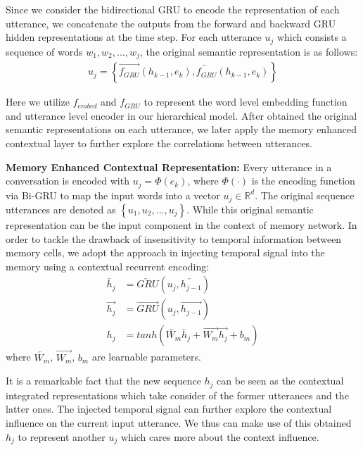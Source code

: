 \documentclass[sigconf]{acmart}
\begin{document}
Since we consider the bidirectional GRU to encode the representation of each utterance, we concatenate the outputs from the forward and backward GRU hidden representations at the time step. For each utterance $u_j$ which consists a sequence of words $w_1,w_2,...,w_j$, the original semantic representation is as follows:
\begin{align*}
	u_j=\left\lbrace \overrightarrow{{f_{GRU}}}(h_{k-1},e_k),\overleftarrow{{f_{GRU}}}(h_{k-1},e_k)  \right\rbrace \tag{2}
\end{align*}   

Here we utilize $f_{embed}$ and $f_{GRU}$ to represent the word level embedding function and utterance level encoder in our hierarchical model. After obtained the original semantic representations on each utterance, we later apply the memory enhanced contextual layer to further explore the correlations between utterances. 

\noindent \textbf{Memory Enhanced Contextual Representation: } Every utterance in a conversation is encoded with $u_j=\Phi(e_k)$, where $\Phi\left (\cdot \right)$ is the encoding function via Bi-GRU to map the input words into a vector $u_j \in \mathbb{R}^d$. The original sequence utterances are denoted as $\left\lbrace u_1,u_2,...,u_j \right\rbrace $. While this original semantic representation can be the input component in the context of memory network. In order to tackle the drawback of insensitivity to temporal information between memory cells, we adopt the approach in injecting temporal signal into the memory using a contextual recurrent encoding:
\begin{align*}
	\overleftarrow{h_j}&=\overleftarrow{GRU}(u_j,\overleftarrow{h_{j-1}}) \\
	\overrightarrow{h_j}&=\overrightarrow{GRU}(u_j,\overrightarrow{h_{j-1}}) \\
	h_j&=tanh(\overleftarrow{W_m}\overleftarrow{h_j}+\overrightarrow{W_m}\overrightarrow{h_j}+b_m) \tag{3}
\end{align*} 
where $\overleftarrow{W_m}$, $\overrightarrow{W_m}$, $b_m$ are learnable parameters.

It is a remarkable fact that the new sequence $h_j$ can be seen as the contextual integrated representations which take consider of the former utterances and the latter ones. The injected temporal signal can further explore the contextual influence on the current input utterance. We thus can make use of this obtained $h_j$ to represent another $u_j$ which cares more about the context influence.
\end{document}
